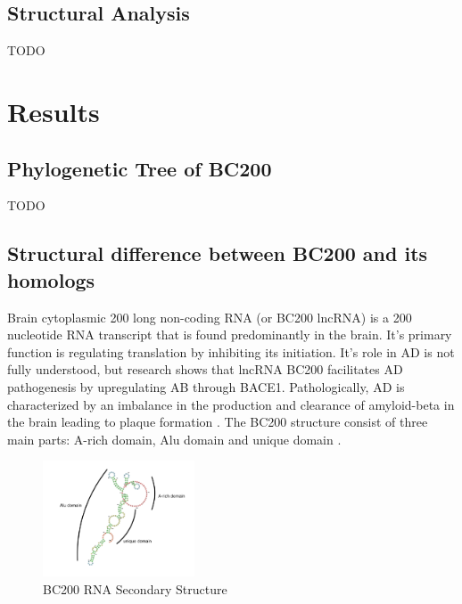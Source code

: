 \documentclass[conference]{IEEEtran}
\begin{document}
\subsection{Structural Analysis}
TODO

\section{Results}\label{sec:results}

\subsection{Phylogenetic Tree of BC200}
TODO

\subsection{Structural difference between BC200 and its homologs}

Brain cytoplasmic 200 long non-coding RNA (or BC200 lncRNA) is a 200 nucleotide RNA transcript that is found predominantly in the brain. 
It's primary function is regulating translation by inhibiting its initiation. 
It's role in AD is not fully understood, but research shows that lncRNA BC200 facilitates AD pathogenesis by upregulating AB through BACE1. 
Pathologically, AD is characterized by an imbalance in the production and clearance of amyloid-beta in the brain leading to plaque formation \cite{li2018identification}.
The BC200 structure consist of three main parts: A-rich domain, Alu domain and unique domain \cite{jung2014rna}.

\begin{figure}[h]
  \centering
  \label{fig:bc200-structure}
  \includegraphics[width=0.4\textwidth]{figs/rna-6.png}
  \caption{BC200 RNA Secondary Structure}
\end{figure}
\end{document}
